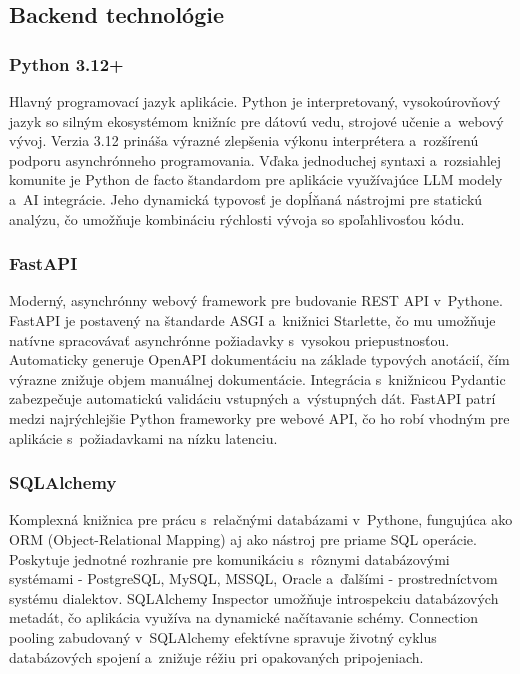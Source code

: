 \documentclass[a4paper, 12pt]{article}
\begin{document}
\subsection{Backend technológie}

\subsubsection*{Python 3.12+}

Hlavný programovací jazyk aplikácie. Python je interpretovaný, vysokoúrovňový jazyk so silným ekosystémom knižníc pre dátovú vedu, strojové učenie a~webový vývoj. Verzia 3.12 prináša výrazné zlepšenia výkonu interprétera a~rozšírenú podporu asynchrónneho programovania. Vďaka jednoduchej syntaxi a~rozsiahlej komunite je Python de facto štandardom pre aplikácie využívajúce LLM modely a~AI integrácie. Jeho dynamická typovosť je dopĺňaná nástrojmi pre statickú analýzu, čo umožňuje kombináciu rýchlosti vývoja so spoľahlivosťou kódu.

\subsubsection*{FastAPI}

Moderný, asynchrónny webový framework pre budovanie REST API v~Pythone. FastAPI je postavený na štandarde ASGI a~knižnici Starlette, čo mu umožňuje natívne spracovávať asynchrónne požiadavky s~vysokou priepustnosťou. Automaticky generuje OpenAPI dokumentáciu na základe typových anotácií, čím výrazne znižuje objem manuálnej dokumentácie. Integrácia s~knižnicou Pydantic zabezpečuje automatickú validáciu vstupných a~výstupných dát. FastAPI patrí medzi najrýchlejšie Python frameworky pre webové API, čo ho robí vhodným pre aplikácie s~požiadavkami na nízku latenciu.

\subsubsection*{SQLAlchemy}

Komplexná knižnica pre prácu s~relačnými databázami v~Pythone, fungujúca ako ORM (Object-Relational Mapping) aj ako nástroj pre priame SQL operácie. Poskytuje jednotné rozhranie pre komunikáciu s~rôznymi databázovými systémami - PostgreSQL, MySQL, MSSQL, Oracle a~ďalšími - prostredníctvom systému dialektov. SQLAlchemy Inspector umožňuje introspekciu databázových metadát, čo aplikácia využíva na dynamické načítavanie schémy. Connection pooling zabudovaný v~SQLAlchemy efektívne spravuje životný cyklus databázových spojení a~znižuje réžiu pri opakovaných pripojeniach.
\end{document}
